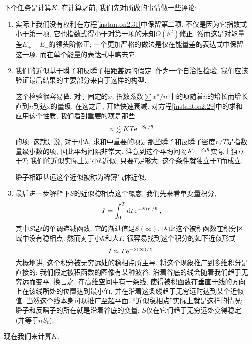 下个任务是计算$K$. 在计算之前, 我们先对所做的事情做一些评论:
\begin{enumerate}
    \item 实际上我们没有权利在方程\eqref{instanton2.31}中保留第二项. 不仅是因为它指数式小于第一项, 它也指数式得小于对第一项的未知$O(\hbar^{2})$修正. 然而这是对能量差$E_{+}-E_{-}$的领头阶修正; 一个更加严格的做法是仅在能量差的表达式中保留这一项, 而在单个能量的表达式中略去它.
    \item 我们的近似基于瞬子和反瞬子相距甚远的假定. 作为一个自洽性检验, 我们应该验证最后结果的主要部分来自于这样的构型. 
    
    这个检验很容易做. 对于固定的$x$, 指数系数$\sum x^{n}/n!$中的项随着$n$的增长而增长直到$n$到达$x$的量级, 在这之后, 开始快速衰减. 对方程\eqref{instanton2.29}中的求和应用这个性质, 我们看到重要的项是那些
    \begin{equation}
        n \lesssim KT \mathrm{e}^{-S_{0}/\hbar} \label{instanton2.33}
    \end{equation}
    的项. 这就是说, 对于小$\hbar$, 求和中重要的项是那些瞬子和反瞬子密度$n/T$是指数量级小数的项, 因此平均间隔非常大. 注意到这个平均间隔$K\mathrm{e}^{-S_{0}\hbar}$实际上独立于$T$; 我们的近似实际上是小$\hbar$近似; 只要$T$足够大, 这个条件就独立于$T$而成立.

    瞬子相距甚远这个近似被称为稀薄气体近似.
    \item 最后进一步解释下$S$的近似稳相点这个概念. 我们先来看单变量积分,
    \begin{equation}
        I=\int_{0}^{T} \mathrm{d} t\: \mathrm{e}^{-S(t)/\hbar} \:, \label{instanton2.34}
    \end{equation}
    其中$S$是$t$的单调递减函数, 它的渐进值是$S(\infty)$. 因此这个被积函数在积分区域中没有稳相点. 然而对于小$\hbar$和大$T$, 很容易找到这个积分的如下近似形式
    \begin{equation}
        I\approx T \mathrm{e}^{-S(\infty)/\hbar} \:. \label{instanton2.35}
    \end{equation}
    大概地讲, 这个积分被无穷远处的稳相点所主导. 将这个现象推广到多维积分是直接的: 我们假定被积函数的图像有某种波谷; 沿着谷底的线会随着我们趋于无穷远而变平. 换言之, 在高维空间中有一条线, 使得被积函数在垂直于线的方向上在该线所处的位置达到最小值, 并在沿着这条线趋于无穷远时达到某个近似值. 当然这个线本身可以推广至超平面. ``近似稳相点''实际上就是这样的情况; 瞬子和反瞬子的所在就是沿着谷底的变量; $S$仅在它们趋于无穷远处变得稳定(并等于$nS_{0}$).
\end{enumerate}
\vspace{0.5cm}
现在我们来计算$K$.


